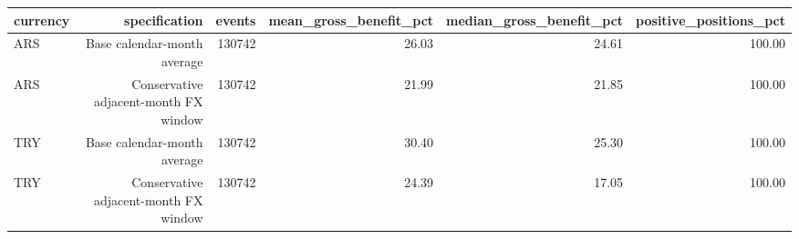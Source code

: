 \begin{tabular}{lrrrrr}
\toprule
currency & specification & events & mean\_gross\_benefit\_pct & median\_gross\_benefit\_pct & positive\_positions\_pct \\
\midrule
ARS & Base calendar-month average & 130742 & 26.03 & 24.61 & 100.00 \\
ARS & Conservative adjacent-month FX window & 130742 & 21.99 & 21.85 & 100.00 \\
TRY & Base calendar-month average & 130742 & 30.40 & 25.30 & 100.00 \\
TRY & Conservative adjacent-month FX window & 130742 & 24.39 & 17.05 & 100.00 \\
\bottomrule
\end{tabular}
